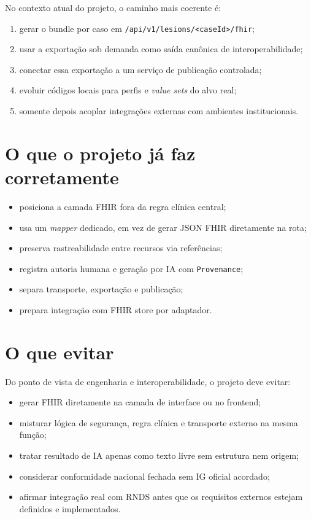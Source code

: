 \documentclass[
    12pt,
    openright,
    oneside,
    a4paper,
    chapter=TITLE,
    section=TITLE,
    brazil,
    sumario=tradicional,
    hidelinks
]{abntex2}
\begin{document}
No contexto atual do projeto, o caminho mais coerente \'e:

\begin{enumerate}
    \item gerar o bundle por caso em \texttt{/api/v1/lesions/<caseId>/fhir};
    \item usar a exporta\c{c}\~ao sob demanda como sa\'ida can\^onica de interoperabilidade;
    \item conectar essa exporta\c{c}\~ao a um servi\c{c}o de publica\c{c}\~ao controlada;
    \item evoluir c\'odigos locais para perfis e \textit{value sets} do alvo real;
    \item somente depois acoplar integra\c{c}\~oes externas com ambientes institucionais.
\end{enumerate}

\section{O que o projeto j\'a faz corretamente}

\begin{itemize}
    \item posiciona a camada FHIR fora da regra cl\'inica central;
    \item usa um \textit{mapper} dedicado, em vez de gerar JSON FHIR diretamente na rota;
    \item preserva rastreabilidade entre recursos via refer\^encias;
    \item registra autoria humana e gera\c{c}\~ao por IA com \texttt{Provenance};
    \item separa transporte, exporta\c{c}\~ao e publica\c{c}\~ao;
    \item prepara integra\c{c}\~ao com FHIR store por adaptador.
\end{itemize}

\section{O que evitar}

Do ponto de vista de engenharia e interoperabilidade, o projeto deve evitar:

\begin{itemize}
    \item gerar FHIR diretamente na camada de interface ou no frontend;
    \item misturar l\'ogica de seguran\c{c}a, regra cl\'inica e transporte externo na mesma fun\c{c}\~ao;
    \item tratar resultado de IA apenas como texto livre sem estrutura nem origem;
    \item considerar conformidade nacional fechada sem IG oficial acordado;
    \item afirmar integra\c{c}\~ao real com RNDS antes que os requisitos externos estejam definidos e implementados.
\end{itemize}
\end{document}
